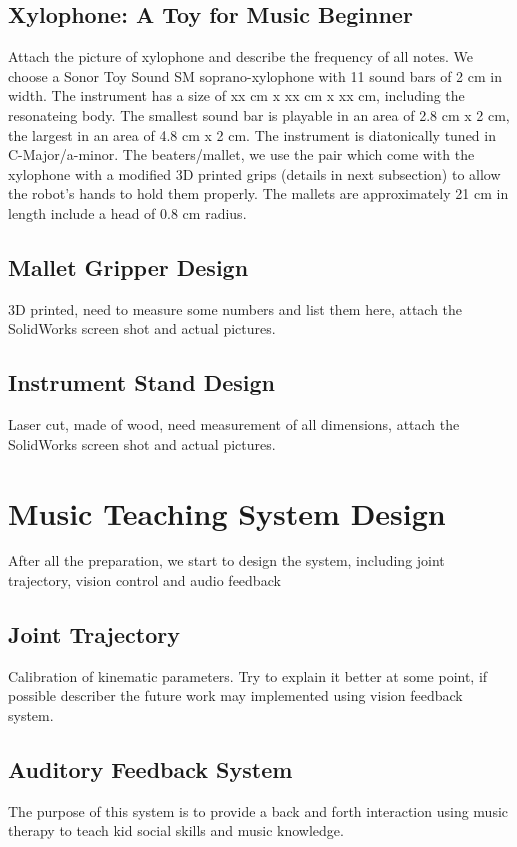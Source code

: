 \subsection{Xylophone: A Toy for Music Beginner}
Attach the picture of xylophone and describe the frequency of all notes.
We choose a Sonor Toy Sound SM soprano-xylophone with 11 sound bars of 2 cm in width. The instrument has a size of xx cm x xx cm x xx cm, including the resonateing body. The smallest sound bar is playable in an area of 2.8 cm x 2 cm, the largest in an area of 4.8 cm x 2 cm. The instrument is diatonically tuned in C-Major/a-minor. The beaters/mallet, we use the pair which come with the xylophone with a modified 3D printed grips (details in next subsection) to allow the robot's hands to hold them properly. The mallets are approximately 21 cm in length include a head of 0.8 cm radius.

\subsection{Mallet Gripper Design}
3D printed, need to measure some numbers and list them here, attach the SolidWorks
screen shot and actual pictures.

\subsection{Instrument Stand Design}
Laser cut, made of wood, need measurement of all dimensions, attach the SolidWorks
screen shot and actual pictures.

\section{Music Teaching System Design}
After all the preparation, we start to design the system, including joint trajectory, vision control and audio feedback

\subsection{Joint Trajectory}
Calibration of kinematic parameters. Try to explain it better at some point, if possible describer the future work may implemented using vision feedback system. 

\subsection{Auditory Feedback System}
The purpose of this system is to provide a back and forth interaction using music therapy to teach kid social skills and music knowledge.

